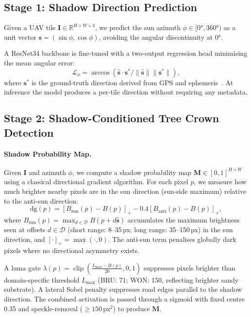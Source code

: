 \documentclass[10pt,twocolumn]{article}
\begin{document}
\subsection{Stage 1: Shadow Direction Prediction}

Given a UAV tile $\mathbf{I} \in \mathbb{R}^{H \times W \times 3}$, we predict
the sun azimuth $\phi \in [0°, 360°)$ as a unit vector
$\mathbf{s} = (\sin\phi, \cos\phi)$, avoiding the angular discontinuity at $0°$.

A ResNet34 backbone is fine-tuned with a two-output regression head minimising
the mean angular error:
\begin{equation}
  \mathcal{L}_\phi = \arccos\!\left(
    \hat{\mathbf{s}} \cdot \mathbf{s}^* / \|\hat{\mathbf{s}}\| \|\mathbf{s}^*\|
  \right),
\end{equation}
where $\mathbf{s}^*$ is the ground-truth direction derived from GPS and
ephemeris~\cite{reda2004solar}. At inference the model produces a per-tile
direction without requiring any metadata.

\subsection{Stage 2: Shadow-Conditioned Tree Crown Detection}
\label{sec:stage2}

\paragraph{Shadow Probability Map.}
Given $\mathbf{I}$ and azimuth $\phi$, we compute a shadow probability map
$\mathbf{M} \in [0,1]^{H \times W}$ using a classical directional gradient
algorithm. For each pixel $p$, we measure how much brighter nearby pixels are
in the sun direction (sun-side maximum) relative to the anti-sun direction:
\begin{equation}
  \mathrm{dg}(p) = \left[B_{\mathrm{sun}}(p) - B(p)\right]_+ -
                    0.4\left[B_{\mathrm{anti}}(p) - B(p)\right]_+,
\end{equation}
where $B_{\mathrm{sun}}(p) = \max_{d \in \mathcal{D}} B(p + d\hat{\mathbf{s}})$
accumulates the maximum brightness seen at offsets $d \in \mathcal{D}$
(short range: 8--35\,px; long range: 35--150\,px) in the sun direction, and
$[\cdot]_+ = \max(\cdot, 0)$.
The anti-sun term penalises globally dark pixels where no directional asymmetry
exists.

A luma gate $\lambda(p) = \operatorname{clip}\!\left(\frac{L_{\max} - B(p)}{20}, 0, 1\right)$
suppresses pixels brighter than domain-specific threshold $L_{\max}$
(BRU: 71; WON: 150, reflecting brighter sandy substrate).
A lateral Sobel penalty suppresses road edges parallel to the shadow direction.
The combined activation is passed through a sigmoid with fixed centre 0.35 and
speckle-removal ($\ge 150$\,px$^2$) to produce $\mathbf{M}$.
\end{document}
